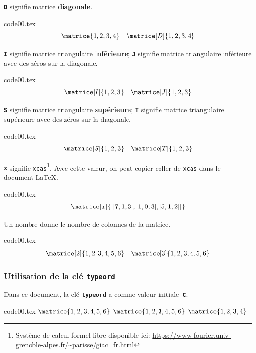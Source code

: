 \documentclass[full]{l3doc}
\newcommand{\ObjetPres}[2]{\textcolor{#1}{\textbf{\texttt{#2}}}}
\newcommand{\keyname}{\ObjetPres{keycolor}}
\newcommand{\TypeMat}{\ObjetPres{keyword30}}
\newcommand{\UnExemple}{%
  \par \medskip \par \noindent
  \begin{minipage}[c]{0.66\linewidth}
    
  \end{minipage}
  \hspace{\stretch{1}}
  \begin{minipage}[c]{0.32\linewidth}
    \small
    
  \end{minipage}
  \par \medbreak}
\begin{document}
 \TypeMat{D} signifie matrice \textbf{diagonale}.
\begin{VerbatimOut}[gobble=0]{code00.tex}
\[
 \matrice{1, 2, 3, 4}\quad
 \matrice[D]{1, 2, 3, 4}
\]
\end{VerbatimOut}
\UnExemple{}

\TypeMat{I} signifie matrice triangulaire \textbf{inférieure}; \TypeMat{J}
signifie matrice triangulaire inférieure avec des zéros sur la diagonale.
\begin{VerbatimOut}[gobble=0]{code00.tex}
\[
 \matrice[I]{1, 2, 3}\quad
 \matrice[J]{1, 2, 3}
\]
\end{VerbatimOut}
\UnExemple{}

\TypeMat{S} signifie matrice triangulaire \textbf{supérieure}; \TypeMat{T}
signifie matrice triangulaire supérieure avec des zéros sur la diagonale.
\begin{VerbatimOut}[gobble=0]{code00.tex}
\[
 \matrice[S]{1, 2, 3}\quad
 \matrice[T]{1, 2, 3}
\]
\end{VerbatimOut}
\UnExemple{}

\TypeMat{x} signifie \texttt{xcas}\footnote{Système de calcul formel libre
  disponible ici:
  \url{https://www-fourier.univ-grenoble-alpes.fr/~parisse/giac_fr.html}}. Avec
cette valeur, on peut copier-coller de \texttt{xcas} dans le document \LaTeX{}.
\begin{VerbatimOut}[gobble=0]{code00.tex}
\[
 \matrice[x]{[[7,1,3],[1,0,3],[5,1,2]]}
\]
\end{VerbatimOut}
\UnExemple{}

\pagebreak[3]
Un nombre donne le nombre de colonnes de la matrice.
\begin{VerbatimOut}[gobble=0]{code00.tex}
\[
 \matrice[2]{1, 2, 3, 4, 5, 6}
 \quad
 \matrice[3]{1, 2, 3, 4, 5, 6}
\]
\end{VerbatimOut}
\UnExemple{}


\subsubsection{Utilisation de la clé \og \keyname{typeord}\fg}
\label{sec:matrix-type-key}

Dans ce document, la clé \keyname{typeord} a comme valeur initiale~\TypeMat{C}.

\medskip{}

\begin{VerbatimOut}[gobble=0]{code00.tex}
$\matrice{1, 2, 3, 4, 5, 6}$\quad
{}
$\matrice{1, 2, 3, 4, 5, 6}$\quad
{}
$\matrice{1, 2, 3, 4}$
\end{VerbatimOut}
\UnExemple{}
\end{document}
